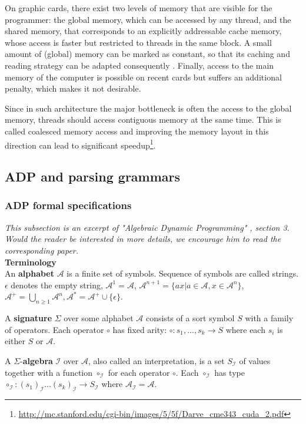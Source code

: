 On graphic cards, there exist two levels of memory that are visible for the programmer: the global memory, which can be accessed by any thread, and the shared memory, that corresponds to an explicitly addressable cache memory, whose access is faster but restricted to threads in the same block. A small amount of (global) memory can be marked as constant, so that its caching and reading strategy can be adapted consequently \cite{cuda_constant}. Finally, access to the main memory of the computer is possible on recent cards but suffers an additional penalty, which makes it not desirable.

Since in such architecture the major bottleneck is often the access to the global memory, threads should access contiguous memory at the same time. This is called coalesced memory access and improving the memory layout in this direction can lead to significant speedup\footnote{\url{http://mc.stanford.edu/cgi-bin/images/5/5f/Darve_cme343_cuda_2.pdf}}.

\newpage
\subsection{ADP and parsing grammars} \label{adp_grammar}
\subsubsection{ADP formal specifications}
\textit{This subsection is an excerpt of "Algebraic Dynamic Programming" \cite{adp}, section 3. Would the reader be interested in more details, we encourage him to read the corresponding paper.} \\[6pt]
\textbf{Terminology}\\
An \textbf{alphabet} $\mathcal{A}$ is a finite set of symbols. Sequence of symbols are called strings. $\epsilon$ denotes the empty string, $\mathcal{A}^1=\mathcal{A}$, $\mathcal{A}^{n+1}=\{ax|a\in\mathcal{A},x\in\mathcal{A}^n\}$, $\mathcal{A}^+=\bigcup_{n\ge 1}\mathcal{A}^n,\mathcal{A}^*=\mathcal{A}^+\cup\{\epsilon\}$.

A \textbf{signature} $\Sigma$ over some alphabet $\mathcal{A}$ consists of a sort symbol $S$ with a family of operators. Each operator $\circ$ has fixed arity: $\circ:s_1,...,s_k\to S$ where each $s_i$ is either $S$ or $\mathcal{A}$.

A $\Sigma$-\textbf{algebra} $\mathcal{I}$ over $\mathcal{A}$, also called an interpretation, is a set $S_\mathcal{I}$ of values together with a function $\circ_\mathcal{I}$ for each operator $\circ$. Each $\circ_\mathcal{I}$ has type $\circ_\mathcal{I}: (s_1)_\mathcal{I} ...(s_k)_\mathcal{I} \to S_\mathcal{I}$ where $\mathcal{A}_\mathcal{I} = \mathcal{A}$.


